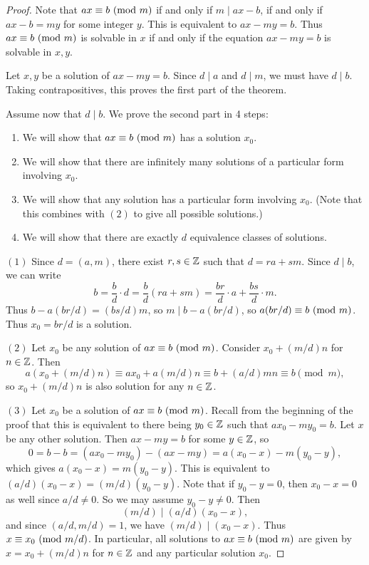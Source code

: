 \begin{proof}
  Note that $ax \equiv b \ (\mathrm{mod}\ m)$ if
  and only if $m \mid ax - b$, if
  and only if $ax - b = my$ for some
  integer $y$. This is equivalent to
  $ax - my = b$. Thus $ax \equiv b \ (\mathrm{mod}\ m)$
  is solvable in $x$ if and only if
  the equation $ax - my = b$ is solvable
  in $x, y$.

  Let $x, y$ be a solution of
  $ax - my = b$. Since $d \mid a$ and
  $d \mid m$, we must have $d \mid b$.
  Taking contrapositives, this
  proves the first part of the theorem.

  Assume now that $d \mid b$. We prove
  the second part in 4 steps:
  \begin{enumerate}
    \item We will show that $ax \equiv b \ (\mathrm{mod}\ m)$
      has a solution $x_0$.
    \item We will show that there are
      infinitely many solutions
      of a particular form involving $x_0$.
    \item We will show that
      any solution has a particular
      form involving $x_0$. (Note that
      this combines with $(2)$ to give
      all possible solutions.)
    \item We will show that there are
      exactly $d$ equivalence classes
      of solutions.
  \end{enumerate}

  $(1)$ Since $d = (a, m)$, there exist
  $r, s \in \mathbb{Z}$ such that $d = ra + sm$.
  Since $d \mid b$, we can write
  \[
    b = \frac{b}{d} \cdot d
    = \frac{b}{d}(ra + sm)
    = \frac{br}{d} \cdot a + \frac{bs}{d} \cdot m.
  \]
  Thus $b - a(b r/ d) = (b s/ d) m$,
  so $m \mid b - a(b r/ d)$, so
  $a(br / d) \equiv b \ (\mathrm{mod}\ m)$.
  Thus $x_0 = br / d$ is a solution.

  $(2)$ Let $x_0$ be any solution of
  $ax \equiv b \ (\mathrm{mod}\ m)$. Consider
  $x_0 + (m / d) n$ for $n \in \mathbb{Z}$. Then
  \[
    a (x_0 + (m / d) n)
    \equiv a x_0 + a (m / d) n
    \equiv b + (a / d)mn
    \equiv b \pmod{m},
  \]
  so $x_0 + (m / d) n$ is also solution
  for any $n \in \mathbb{Z}$.

  $(3)$ Let $x_0$ be a solution of
  $ax \equiv b \ (\mathrm{mod}\ m)$. Recall from the
  beginning of the proof that this is
  equivalent to there being
  $y_0 \in \mathbb{Z}$ such that
  $ax_0 - my_0 = b$. Let $x$ be any other
  solution. Then $ax - my = b$
  for some $y \in \mathbb{Z}$, so
  \[
    0 = b - b = (ax_0 - my_0) - (ax - my)
    = a(x_0 - x) - m(y_0 - y),
  \]
  which gives $a(x_0 - x) = m(y_0 - y)$.
  This is equivalent to
  $(a / d)(x_0 - x) = (m / d)(y_0 - y)$.
  Note that if $y_0 - y = 0$, then
  $x_0 - x = 0$ as well since
  $a / d \ne 0$. So we may assume
  $y_0 - y \ne 0$. Then
  \[(m / d) \mid (a / d)(x_0 - x),\]
  and since $(a / d, m / d) = 1$, we have
  $(m / d) \mid (x_0 - x)$. Thus
  $x \equiv x_0 \ (\mathrm{mod}\ m / d)$. In
  particular, all solutions to
  $ax \equiv b \ (\mathrm{mod}\ m)$ are given by
  $x = x_0 + (m / d) n$ for
  $n \in \mathbb{Z}$ and any particular
  solution $x_0$.


\end{proof}
